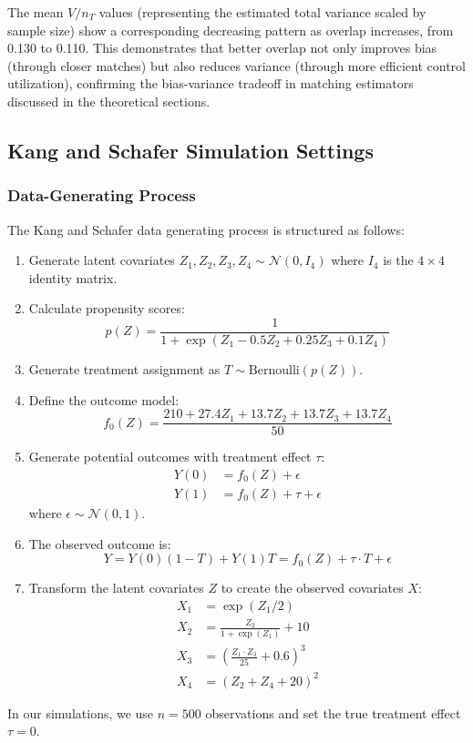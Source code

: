 \documentclass{mytemplate}
\begin{document}
The mean $V/n_T$ values (representing the estimated total variance scaled by sample size) show a corresponding decreasing pattern as overlap increases, from 0.130 to 0.110. This demonstrates that better overlap not only improves bias (through closer matches) but also reduces variance (through more efficient control utilization), confirming the bias-variance tradeoff in matching estimators discussed in the theoretical sections.



\subsection{Kang and Schafer Simulation Settings}
\label{subsec:ks-dgp}

\subsubsection{Data-Generating Process}

The Kang and Schafer data generating process is structured as follows:

\begin{enumerate}
\item Generate latent covariates $Z_1, Z_2, Z_3, Z_4 \sim \mathcal{N}(0, I_4)$ where $I_4$ is the $4 \times 4$ identity matrix.

\item Calculate propensity scores:
\begin{equation}
p(Z) = \frac{1}{1 + \exp(Z_1 - 0.5Z_2 + 0.25Z_3 + 0.1Z_4)}
\end{equation}

\item Generate treatment assignment as $T \sim \text{Bernoulli}(p(Z))$.

\item Define the outcome model:
\begin{equation}
f_0(Z) = \frac{210 + 27.4Z_1 + 13.7Z_2 + 13.7Z_3 + 13.7Z_4}{50}
\end{equation}

\item Generate potential outcomes with treatment effect $\tau$:
\begin{align}
Y(0) &= f_0(Z) + \epsilon\\
Y(1) &= f_0(Z) + \tau + \epsilon
\end{align}
where $\epsilon \sim \mathcal{N}(0,1)$.

\item The observed outcome is:
\begin{equation}
Y = Y(0)(1-T) + Y(1)T = f_0(Z) + \tau \cdot T + \epsilon
\end{equation}

\item Transform the latent covariates $Z$ to create the observed covariates $X$:
\begin{align}
X_1 &= \exp(Z_1/2)\\
X_2 &= \frac{Z_2}{1 + \exp(Z_1)} + 10\\
X_3 &= \left(\frac{Z_1 \cdot Z_3}{25} + 0.6\right)^3\\
X_4 &= (Z_2 + Z_4 + 20)^2
\end{align}
\end{enumerate}

In our simulations, we use $n=500$ observations and set the true treatment effect $\tau = 0$.
\end{document}
